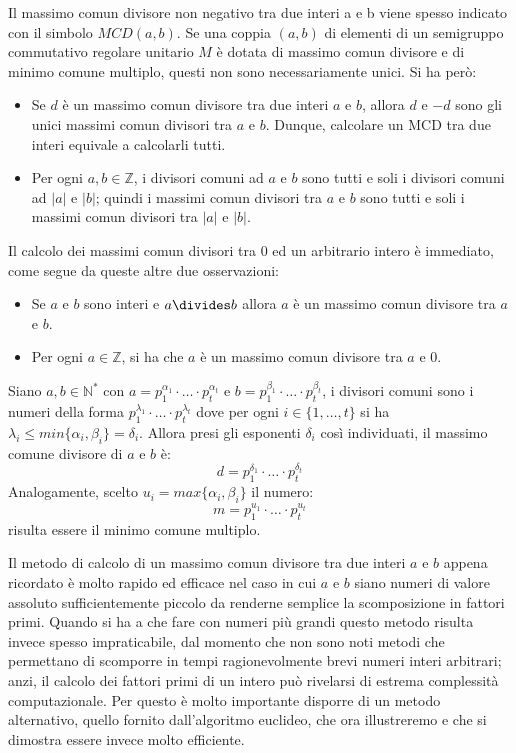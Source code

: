 Il massimo comun divisore non negativo tra due interi a e b viene spesso indicato con il simbolo $MCD(a, b)$. Se una coppia $(a,b)$ di elementi di un semigruppo commutativo regolare unitario $M$ è dotata di massimo comun divisore e di minimo comune multiplo, questi non sono necessariamente unici. Si ha però:
\begin{itemize}
	\item Se $d$ è un massimo comun divisore tra due interi $a$ e $b$, allora $d$ e $-d$ sono gli unici massimi comun divisori tra $a$ e $b$. Dunque, calcolare un MCD tra due interi equivale a calcolarli tutti.
	\item Per ogni $a,b \in \mathbb{Z}$, i divisori comuni ad $a$ e $b$ sono tutti e soli i divisori comuni ad $|a|$ e $|b|$; quindi i massimi comun divisori tra $a$ e $b$ sono tutti e soli i massimi comun divisori tra $|a|$ e $|b|$.
\end{itemize}
Il calcolo dei massimi comun divisori tra 0 ed un arbitrario intero è immediato, come segue da queste altre due osservazioni:
\begin{itemize}
	\item Se $a$ e $b$ sono interi e $a \divides b$ allora $a$ è un massimo comun divisore tra $a$ e $b$.
	\item Per ogni $a \in \mathbb{Z}$, si ha che $a$ è un massimo comun divisore tra $a$ e $0$.
\end{itemize}

\begin{osservation}
	Siano $a,b \in \mathbb{N}^{*}$ con $a=p_{1}^{\alpha_{1}}\cdot \ldots \cdot p_{t}^{\alpha_{t}}$ e $b=p_{1}^{\beta_{1}}\cdot \ldots \cdot p_{t}^{\beta_{t}}$, i divisori comuni sono i numeri della forma $p_{1}^{\lambda_{1}}\cdot \ldots \cdot p_{t}^{\lambda_{t}}$ dove per ogni $i \in \{1,\ldots,t\}$ si ha $\lambda_{i} \leq min \{\alpha_{i},\beta_{i}\} = \delta_{i}$. Allora presi gli esponenti $\delta_{i}$ così individuati, il massimo comune divisore di $a$ e $b$ è:
	\begin{displaymath}
		d = p_{1}^{\delta_{1}}\cdot \ldots \cdot p_{t}^{\delta_{t}}
	\end{displaymath}
	Analogamente, scelto $u_{i}=max\{\alpha_{i},\beta_{i}\}$ il numero:
	\begin{displaymath}
		m = p_{1}^{u_{1}}\cdot \ldots \cdot p_{t}^{u_{t}}
	\end{displaymath}
	risulta essere il minimo comune multiplo.
\end{osservation}

Il metodo di calcolo di un massimo comun divisore tra due interi $a$ e $b$ appena ricordato è molto rapido ed efficace nel caso in cui $a$ e $b$ siano numeri di valore assoluto sufficientemente piccolo da renderne semplice la scomposizione in fattori primi. Quando si ha a che fare con numeri più grandi questo metodo risulta invece spesso impraticabile, dal momento che non sono noti metodi che permettano di scomporre in tempi ragionevolmente brevi numeri interi arbitrari; anzi, il calcolo dei fattori primi di un intero può rivelarsi di estrema complessità computazionale. Per questo è molto importante disporre di un metodo alternativo, quello fornito dall’algoritmo euclideo, che ora illustreremo e che si dimostra essere invece molto efficiente. 

